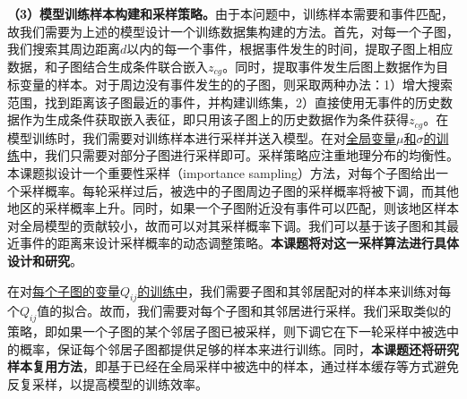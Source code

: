 \documentclass[12pt,UTF8,AutoFakeBold=2,a4paper]{ctexart} %
\begin{document}
\textbf{（3）模型训练样本构建和采样策略。}由于本问题中，训练样本需要和事件匹配，故我们需要为上述的模型设计一个训练数据集构建的方法。首先，对每一个子图，我们搜索其周边距离$d$以内的每一个事件，根据事件发生的时间，提取子图上相应数据，和子图结合生成条件联合嵌入$z_{cg}$。同时，提取事件发生后图上数据作为目标变量的样本。对于周边没有事件发生的的子图，则采取两种办法：1）增大搜索范围，找到距离该子图最近的事件，并构建训练集，2）直接使用无事件的历史数据作为生成条件获取嵌入表征，即只用该子图上的历史数据作为条件获得$z_{cg}$。在模型训练时，我们需要对训练样本进行采样并送入模型。在对\underline{全局变量$\mu$和$\sigma$的训练}中，我们只需要对部分子图进行采样即可。采样策略应注重地理分布的均衡性。本课题拟设计一个重要性采样（importance sampling）方法，对每个子图给出一个采样概率。每轮采样过后，被选中的子图周边子图的采样概率将被下调，而其他地区的采样概率上升。同时，如果一个子图附近没有事件可以匹配，则该地区样本对全局模型的贡献较小，故而可以对其采样概率下调。我们可以基于该子图和其最近事件的距离来设计采样概率的动态调整策略。\textbf{本课题将对这一采样算法进行具体设计和研究}。

在对\underline{每个子图的变量$Q_{ij}$的训练中}，我们需要子图和其邻居配对的样本来训练对每个$Q_{ij}$值的拟合。故而，我们需要对每个子图和其邻居进行采样。我们采取类似的策略，即如果一个子图的某个邻居子图已被采样，则下调它在下一轮采样中被选中的概率，保证每个邻居子图都提供足够的样本来进行训练。同时，\textbf{本课题还将研究样本复用方法}，即基于已经在全局采样中被选中的样本，通过样本缓存等方式避免反复采样，以提高模型的训练效率。




\end{document}
